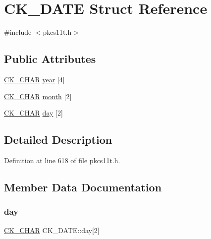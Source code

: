 \hypertarget{struct_c_k___d_a_t_e}{}\section{C\+K\+\_\+\+D\+A\+TE Struct Reference}
\label{struct_c_k___d_a_t_e}


{\ttfamily \#include $<$pkcs11t.\+h$>$}

\subsection*{Public Attributes}
\begin{DoxyCompactItemize}
\item 
\hyperlink{pkcs11t_8h_a0ed4ef152a55e26f435b876927145580}{C\+K\+\_\+\+C\+H\+AR} \hyperlink{struct_c_k___d_a_t_e_a223a9ead1aa935845bea0e9426317131}{year} \mbox{[}4\mbox{]}
\item 
\hyperlink{pkcs11t_8h_a0ed4ef152a55e26f435b876927145580}{C\+K\+\_\+\+C\+H\+AR} \hyperlink{struct_c_k___d_a_t_e_adbc049ebf70a76bb11c7b44dc6c82654}{month} \mbox{[}2\mbox{]}
\item 
\hyperlink{pkcs11t_8h_a0ed4ef152a55e26f435b876927145580}{C\+K\+\_\+\+C\+H\+AR} \hyperlink{struct_c_k___d_a_t_e_ae753815abaa535dbca99dfe3a079cb8a}{day} \mbox{[}2\mbox{]}
\end{DoxyCompactItemize}


\subsection{Detailed Description}


Definition at line 618 of file pkcs11t.\+h.



\subsection{Member Data Documentation}
\mbox{\label{struct_c_k___d_a_t_e_ae753815abaa535dbca99dfe3a079cb8a}} 
\subsubsection{\texorpdfstring{day}{day}}
{\footnotesize\ttfamily \hyperlink{pkcs11t_8h_a0ed4ef152a55e26f435b876927145580}{C\+K\+\_\+\+C\+H\+AR} C\+K\+\_\+\+D\+A\+T\+E\+::day\mbox{[}2\mbox{]}}



